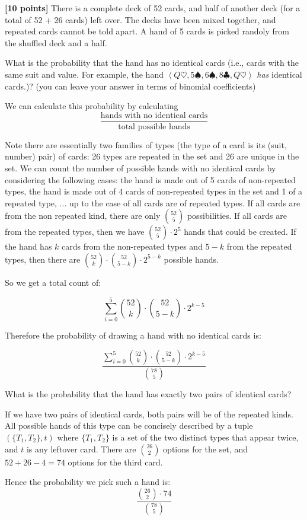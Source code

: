 \documentclass[12pt,oneside]{article}
\begin{document}
\begin{problem} %
{\bf [10 points]}
There is a complete deck of 52 cards, and half of another deck (for a total of 52 + 26 cards) left over. The decks have been mixed together, and repeated cards cannot be told apart. A hand of 5 cards is picked randoly from the shuffled deck and a half.


\ppart {\bf [5 points]} What is the probability that the hand has no identical cards (i.e., cards with the same suit and value. For example, the hand {$\left<Q\heartsuit, 5\spadesuit, 6\spadesuit, 8\clubsuit, Q\heartsuit\right>$} {\em has} identical cards.)?  (you can leave your answer in terms of binomial coefficients)
\vspace{.15in}

We can calculate this probability by calculating
%
\[
\frac{\text{hands with no identical cards}}{\text{total possible hands}}
\]
%

Note there are essentially two families of types (the type of a card is its (suit, number)  pair) of cards: 26 types are repeated in the set and 26 are unique in the set.  We can count the number of possible hands with no identical cards by considering the following cases: the hand is made out of 5 cards of non-repeated types, the hand is made out of 4 cards of non-repeated types in the set and 1 of a repeated type, ... up to the case of all cards are of repeated types. If all cards are from the non repeated kind, there are only $\binom{52}{5}$ possibilities. If all cards are from the repeated types, then we have $\binom{52}{5}\cdot2^5$ hands that could be created. If the hand has $k$ cards from the non-repeated types and $5 - k$ from the repeated types,  then there are $\binom{52}{k}\cdot \binom{52}{5-k} \cdot 2^{5 - k}$ possible hands.

So we get a total count of:

\[
\sum_{i = 0}^5 \binom{52}{k}\cdot \binom{52}{5-k} \cdot 2^{k-5}
\]


Therefore the probability of drawing a hand with no identical cards is:

%
\[
\frac{\sum_{i = 0}^5 \binom{52}{k}\cdot \binom{52}{5-k} \cdot 2^{k-5}}{\binom{78}{5}}
\]
%
\vspace{4 in}

\ppart {\bf [5 points]} What is the probability that the hand has exactly two pairs of identical cards?
\vspace{.15in}

If we have two pairs of identical cards, both pairs will be of the repeated kinds. All possible hands of this type can be concisely described by a tuple $\left( \{T_1, T_2\}, t \right)$ where $\{T_1, T_2\}$ is a set of the two distinct types that appear twice, and $t$ is any leftover card.  There are $\binom{26}{2}$ options for the set, and $52 + 26 - 4 = 74$ options for the third card.

Hence the probability we pick such a hand is:
%
\[
\frac{\binom{26}{2}\cdot 74}{\binom{78}{5}}
\]
%

\end{problem}
\end{document}
